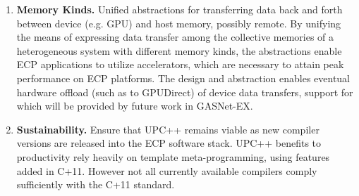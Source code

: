 \begin{enumerate}
\item \textbf{Memory Kinds.}
Unified abstractions for 
transferring data back and forth between device (e.g. GPU) and host memory, possibly remote.
By unifying the means of expressing data transfer among the collective memories of a heterogeneous system with different memory kinds,
the abstractions enable ECP applications to utilize accelerators, which are necessary to attain peak performance on ECP platforms.
The design and abstraction enables eventual hardware offload (such as to GPUDirect) of device data transfers, support for which will be provided by future work in GASNet-EX.

\item \textbf{Sustainability.}
Ensure that UPC++ remains viable as new compiler versions are released into the ECP software stack. UPC++ benefits to productivity rely heavily on template meta-programming, using features added in C+11.  However not all currently available compilers comply sufficiently with the C+11 standard.

\end{enumerate}
